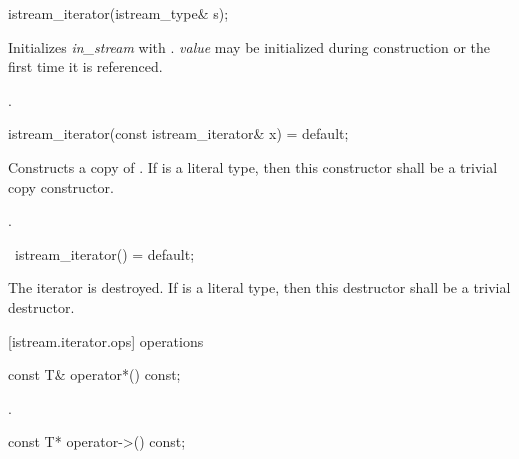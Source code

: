 %
\begin{itemdecl}
istream_iterator(istream_type& s);
\end{itemdecl}

\begin{itemdescr}
\pnum
\effects
Initializes \textit{in_stream} with . \textit{value} may be initialized during
construction or the first time it is referenced.

\pnum
\postcondition {}.
\end{itemdescr}

%
\begin{itemdecl}
istream_iterator(const istream_iterator& x) = default;
\end{itemdecl}

\begin{itemdescr}
\pnum
\effects
Constructs a copy of . If  is a literal type, then this constructor shall be a trivial copy constructor.

\pnum
\postcondition {}.
\end{itemdescr}

%
\begin{itemdecl}
~istream_iterator() = default;
\end{itemdecl}

\begin{itemdescr}
\pnum
\effects
The iterator is destroyed. If  is a literal type, then this destructor shall be a trivial destructor.
\end{itemdescr}

[istream.iterator.ops]{ operations}

%
%
\begin{itemdecl}
const T& operator*() const;
\end{itemdecl}

\begin{itemdescr}
\pnum
\returns
{}.
\end{itemdescr}

%
%
\begin{itemdecl}
const T* operator->() const;
\end{itemdecl}

